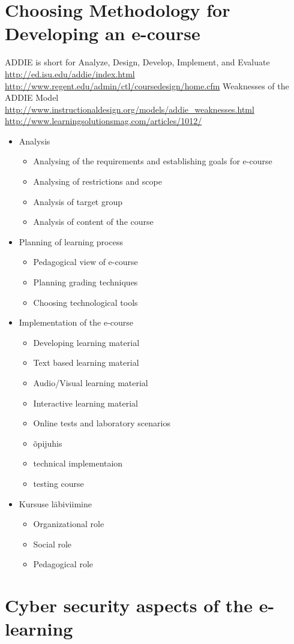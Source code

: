 \section{Choosing Methodology for Developing an e-course}
ADDIE is short for Analyze, Design, Develop, Implement, and Evaluate \url{http://ed.isu.edu/addie/index.html}
\url{http://www.regent.edu/admin/ctl/coursedesign/home.cfm}
Weaknesses of the ADDIE Model \url{http://www.instructionaldesign.org/models/addie_weaknesses.html}
\url{http://www.learningsolutionsmag.com/articles/1012/}


\begin{itemize}
	\item Analysis
	\begin{itemize}
		\item Analysing of the requirements and establishing goals for e-course
		\item Analysing of restrictions and scope
		\item Analysis of target group
		\item Analysis of content of the course
	\end{itemize}
	\item Planning of learning process
	\begin{itemize}
		\item Pedagogical view of e-course
		\item Planning grading techniques
		\item Choosing technological tools
	\end{itemize}
	\item Implementation of the e-course
	\begin{itemize}
		\item Developing learning material
		\item Text based learning material
		\item Audio/Visual learning material
		\item Interactive learning material
		\item Online tests and laboratory scenarios 
		\item õpijuhis 
		\item technical implementaion
		\item testing course
	\end{itemize}
	\item Kursuse läbiviimine
	\begin{itemize}
		\item Organizational role
		\item Social role
		\item Pedagogical role
	\end{itemize}
\end{itemize}

\section{Cyber security aspects of the e-learning}
